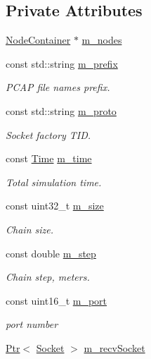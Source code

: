 \subsection*{Private Attributes}
\begin{DoxyCompactItemize}
\item 
\hyperlink{classns3_1_1NodeContainer}{Node\+Container} $\ast$ \hyperlink{classBug772ChainTest_a516c0c86192d926b8277fd3ed0e7f112}{m\+\_\+nodes}
\item 
const std\+::string \hyperlink{classBug772ChainTest_a8008aa030717e255183ef4337d1e3f27}{m\+\_\+prefix}
\begin{DoxyCompactList}\small\item\em P\+C\+AP file names prefix. \end{DoxyCompactList}\item 
const std\+::string \hyperlink{classBug772ChainTest_a107f53a666f3b0c5e7d3065d56bac5e2}{m\+\_\+proto}
\begin{DoxyCompactList}\small\item\em Socket factory T\+ID. \end{DoxyCompactList}\item 
const \hyperlink{classns3_1_1Time}{Time} \hyperlink{classBug772ChainTest_ad9e30dbc5ae2b796084eb0db5cf46602}{m\+\_\+time}
\begin{DoxyCompactList}\small\item\em Total simulation time. \end{DoxyCompactList}\item 
const uint32\+\_\+t \hyperlink{classBug772ChainTest_a7204a38a0c781f1231601e4ee404c8d4}{m\+\_\+size}
\begin{DoxyCompactList}\small\item\em Chain size. \end{DoxyCompactList}\item 
const double \hyperlink{classBug772ChainTest_a8b6f1eaf4682f00c5092be2f4b79ffc3}{m\+\_\+step}
\begin{DoxyCompactList}\small\item\em Chain step, meters. \end{DoxyCompactList}\item 
const uint16\+\_\+t \hyperlink{classBug772ChainTest_a32f57f5fa12f89ab99561d458f430acb}{m\+\_\+port}
\begin{DoxyCompactList}\small\item\em port number \end{DoxyCompactList}\item 
\hyperlink{classns3_1_1Ptr}{Ptr}$<$ \hyperlink{classns3_1_1Socket}{Socket} $>$ \hyperlink{classBug772ChainTest_a4d3a3e78853e99307c08276bac5d7ece}{m\+\_\+recv\+Socket}

\end{DoxyCompactItemize}

